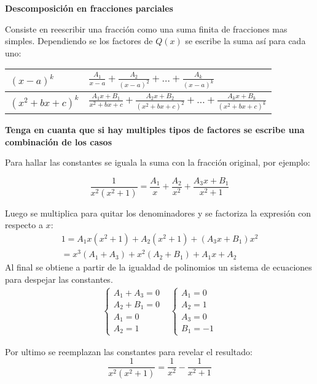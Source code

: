 \documentclass{article}
\newenvironment{formula-box}{
	\begin{tcolorbox}[
		colframe=black, %
		colback=white, %
		arc=1mm, %
		boxrule=1pt, %
		left=2mm, %
		right=2mm, %
		top=2mm, %
		bottom=2mm, %
		]
	}{
	\end{tcolorbox}
}
\begin{document}
\begin{multicols}{2}
		\columnbreak
		
		\begin{formula-box}
			{\raggedright \large \textbf{Descomposición en fracciones parciales} \par}
			
			Consiste en reescribir una fracción como una suma finita de fracciones mas simples. Dependiendo se los factores de $Q(x)$ se escribe la suma así para cada uno:
			
			\vspace{2mm}
			
			\begin{tabularx}{\linewidth}{|p{3cm}|X|}
				\hline
				$(x-a)^k$ & $ \frac{A_1}{x-a} + \frac{A_2}{(x-a)^2} + \dots + \frac{A_k}{(x-a)^k} $ \\
				\hline
				$(x^2+bx+c)^k$ & $ \frac{A_1x+B_1}{x^2+bx+c} + \frac{A_2x+B_2}{(x^2+bx+c)^2} + \dots + \frac{A_kx+B_k}{(x^2+bx+c)^k} $ \\
				\hline
			\end{tabularx}
			
			\vspace{2mm}
			
			\textbf{Tenga en cuanta que si hay multiples tipos de factores se escribe una combinación de los casos}
			
			Para hallar las constantes se iguala la suma con la fracción original, por ejemplo:
			
			\[
			\frac{1}{x^2(x^2+1)} = \frac{A_1}{x} + \frac{A_2}{x^2} + \frac{A_3x+B_1}{x^2+1}
			\]
			
			Luego se multiplica para quitar los denominadores y se factoriza la expresión con respecto a $x$:
			\[
			\begin{array}{c}
				1 = A_1x(x^2+1) + A_2(x^2+1) +(A_3x+B_1)x^2 \\
				= x^3(A_1+A_3) + x^2(A_2+B_1) + A_1x + A_2
			\end{array}
			\]
			Al final se obtiene a partir de la igualdad de polinomios un sistema de ecuaciones para despejar las constantes.
			\[
			\begin{array}{c|c}
				\begin{cases}
					A_1+A_3 = 0 \\
					A_2+B_1 = 0 \\
					A_1 = 0 \\
					A_2 = 1
				\end{cases} & \begin{cases}
					A_1 = 0 \\
					A_2 = 1 \\
					A_3 = 0 \\
					B_1 = -1
				\end{cases}
			\end{array}
			\]
			
			Por ultimo se reemplazan las constantes para revelar el resultado:
			\[
			\frac{1}{x^2(x^2+1)} = \frac{1}{x^2} - \frac{1}{x^2+1}
			\]
		\end{formula-box}
	\end{multicols}
	
\end{document}
